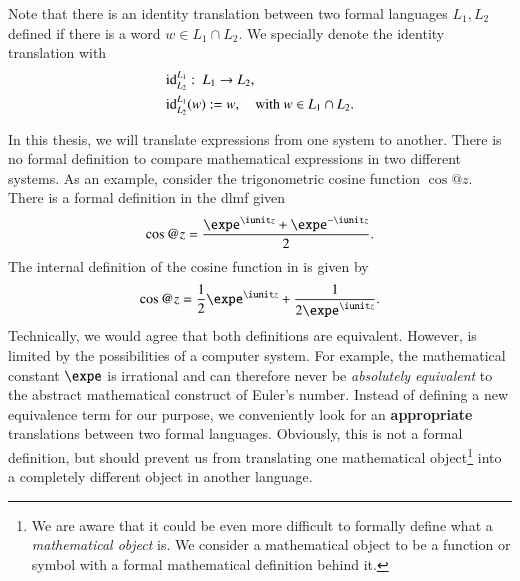 Note that there is an identity translation between two formal languages $L_1, L_2$ defined if there is a word $w \in L_1 \cap L_2$. We specially denote the identity translation with 
\begin{align}
&\mathrm{id}^{L_1}_{L_2}:\ L_1 \rightarrow L_2,\notag\\
&\mathrm{id}^{L_1}_{L_2}(w) := w,\quad \text{with } w \in L_1 \cap L_2.
\end{align}

In this thesis, we will translate expressions from one system to another. There is no formal definition to compare mathematical expressions in two different systems. As an example, consider the trigonometric cosine function $\cos@{z}$. There is a formal definition in the \gls{dlmf} given~\cite[(4.14.2)]{NIST:DLMF}
\begin{equation}
\cos@{z} = \frac{\expe^{\iunit z} + \expe^{-\iunit z}}{2}.
\end{equation}
The internal definition of the cosine function in \Maple{} is given by
\begin{equation}
\cos@{z} = \frac{1}{2}\expe^{\iunit z} + \frac{1}{2\expe^{\iunit z}}.
\end{equation}
Technically, we would agree that both definitions are equivalent. However, \Maple{} is limited by the possibilities of a computer system. For example, the mathematical constant $\expe$ is irrational and can therefore never be \textit{absolutely equivalent} to the abstract mathematical construct of Euler's number. Instead of defining a new equivalence term for our purpose, we conveniently look for an \textbf{appropriate} translations between two formal languages. Obviously, this is not a formal definition, but should prevent us from translating one mathematical object\footnote{We are aware that it could be even more difficult to formally define what a \textit{mathematical object} is. We consider a mathematical object to be a function or symbol with a formal mathematical definition behind it.} into a completely different object in another language.

